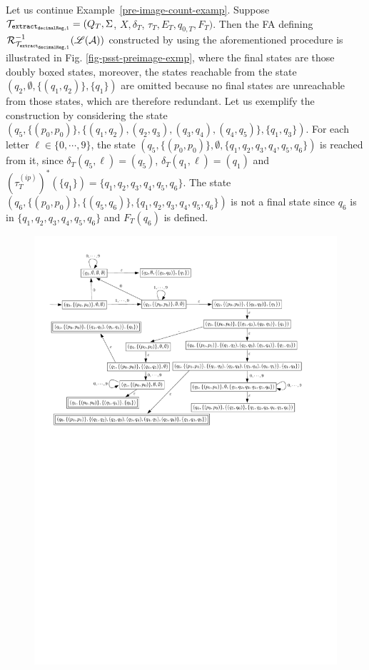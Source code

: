 
\begin{example}
Let us continue Example~\ref{pre-image-count-examp}. Suppose $\mathcal{T}_{\tt extract_{decimalReg,1}} = (Q_T, \Sigma$, $X, \delta_T$, $\tau_T, E_T,  q_{0, T}, F_T)$. Then the FA defining $\mathcal{R}^{-1}_{\mathcal{T}_{\tt extract_{decimalReg,1}}}(\mathscr{L}(\mathcal{A}))$ constructed by using the aforementioned procedure is illustrated in Fig. \ref{fig-psst-preimage-exmp}, where the final states are those doubly boxed states, moreover, the states reachable from the state $(q_2, \emptyset, \{(q_1,q_2)\}, \{q_1\})$ are omitted because no final states are unreachable from those states, which are therefore redundant. Let us exemplify the construction by considering the state $(q_5, \{(p_0,p_0)\}, \{(q_1,q_2), (q_2,q_3), (q_3,q_4), (q_4, q_5)\}, \{q_1,q_3\})$. For each letter $\ell \in \{0,\cdots, 9\}$, the state $(q_5, \{(p_0,p_0)\}, \emptyset, \{q_1,q_2, q_3, q_4, q_5, q_6\})$ is reached from it, since $\delta_T(q_5,\ell)  = (q_5)$, $\delta_T(q_1,\ell) = (q_1)$ and $(\tau^{(ip)}_T)^*(\{q_1\}) = \{q_1, q_2, q_3, q_4, q_5, q_6\}$. The state $(q_6, \{(p_0,p_0)\}, \{(q_5,q_6)\}, \{q_1, q_2, q_3, q_4, q_5, q_6\})$ is not a final state since $q_6$ is in $\{q_1, q_2, q_3, q_4, q_5, q_6\}$ and $F_T(q_6)$ is defined.
%
\begin{figure}[ht]
\centering
\vspace{-4mm}
\includegraphics[width = \textwidth]{psst-preimage-example-new.pdf}

\end{figure}
\end{example}
